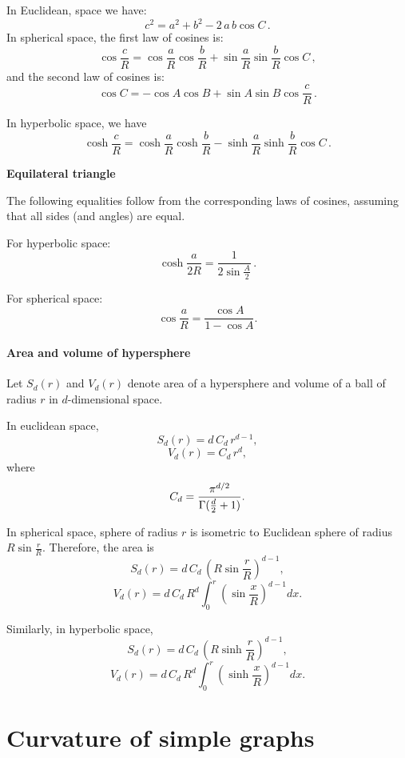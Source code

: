 \documentclass{article} %
\begin{document}
In Euclidean, space we have:
\[
c^2 = a^2 + b^2 - 2 \, a\, b \cos C\,.
\]
In spherical space, the first law of cosines is:
\[
\cos \frac{c}{R} =\cos \frac{a}{R} \cos \frac{b}{R} + \sin \frac{a}{R}\sin \frac{b}{R}\cos C \,,
\]
and the second law of cosines is:
\[
\cos C=-\cos A\cos B+\sin A\sin B\cos \frac{c}{R}\,.
\]

In hyperbolic space, we have 
\[
\cosh {\frac {c}{R}}= \cosh {\frac {a}{R}}\cosh {\frac {b}{R}}-\sinh {\frac {a}{R}}\sinh {\frac {b}{R}}\cos C \,.
\]

\textbf{Equilateral triangle}

The following equalities follow from the corresponding laws of cosines, assuming that all sides (and angles) are equal.

For hyperbolic space:
\begin{equation}\label{eq:hyp_eq}
\cosh\frac{a}{2R} = \frac{1}{2\sin \frac{A}{2}}\,.
\end{equation}

For spherical space:
\begin{equation}\label{eq:sph_eq}
\cos{\frac{a}{R}} = \frac{\cos A}{1 - \cos A}.
\end{equation}

\paragraph{Area and volume of hypersphere}

Let $S_d(r)$ and $V_d(r)$ denote area of a hypersphere and volume of a ball of radius $r$ in $d$-dimensional space. 

In euclidean space,
\[
S_d(r)= d \, C_{d} \, r^{d-1},
\]
\[
V_d(r)= C_{d} \, r^{d},
\]
where
\[
C_{d}={\frac  {\pi ^{{d/2}}}{\Gamma ({d \over 2}+1)}}.
\]

In spherical space, sphere of radius $r$ is isometric to Euclidean sphere of radius $R \sin \frac{r}{R}$. Therefore, the area is 
\[
S_d(r)= d \, C_{d} \, \left( R \sin \frac{r}{R} \right)^{d-1},
\]
\[
V_d(r)= d \, C_{d} \, R^d \int_{0}^{r} \left( \sin \frac{x}{R} \right)^{d-1} d x .
\]

Similarly, in hyperbolic space,
\[
S_d(r)= d \, C_{d} \, \left( R \sinh \frac{r}{R} \right)^{d-1},
\]
\[
V_d(r)= d \, C_{d} \, R^d \int_{0}^{r} \left( \sinh \frac{x}{R} \right)^{d-1} d x .
\]


\section{Curvature of simple graphs}
\end{document}
